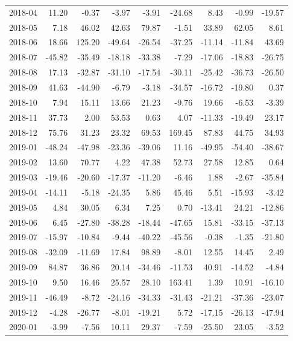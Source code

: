 \begin{table}[ht]
\begin{tabular}{lrrrrrrrr}
  2018-04 & 11.20 & -0.37 & -3.97 & -3.91 & -24.68 & 8.43 & -0.99 & -19.57 \\ 
  2018-05 & 7.18 & 46.02 & 42.63 & 79.87 & -1.51 & 33.89 & 62.05 & 8.61 \\ 
  2018-06 & 18.66 & 125.20 & -49.64 & -26.54 & -37.25 & -11.14 & -11.84 & 43.69 \\ 
  2018-07 & -45.82 & -35.49 & -18.18 & -33.38 & -7.29 & -17.06 & -18.83 & -26.75 \\ 
  2018-08 & 17.13 & -32.87 & -31.10 & -17.54 & -30.11 & -25.42 & -36.73 & -26.50 \\ 
  2018-09 & 41.63 & -44.90 & -6.79 & -3.18 & -34.57 & -16.72 & -19.80 & 0.37 \\ 
  2018-10 & 7.94 & 15.11 & 13.66 & 21.23 & -9.76 & 19.66 & -6.53 & -3.39 \\ 
  2018-11 & 37.73 & 2.00 & 53.53 & 0.63 & 4.07 & -11.33 & -19.49 & 23.17 \\ 
  2018-12 & 75.76 & 31.23 & 23.32 & 69.53 & 169.45 & 87.83 & 44.75 & 34.93 \\ 
  2019-01 & -48.24 & -47.98 & -23.36 & -39.06 & 11.16 & -49.95 & -54.40 & -38.67 \\ 
  2019-02 & 13.60 & 70.77 & 4.22 & 47.38 & 52.73 & 27.58 & 12.85 & 0.64 \\ 
  2019-03 & -19.46 & -20.60 & -17.37 & -11.20 & -6.46 & 1.88 & -2.67 & -35.84 \\ 
  2019-04 & -14.11 & -5.18 & -24.35 & 5.86 & 45.46 & 5.51 & -15.93 & -3.42 \\ 
  2019-05 & 4.84 & 30.05 & 6.34 & 7.25 & 0.70 & -13.41 & 24.21 & -12.86 \\ 
  2019-06 & 6.45 & -27.80 & -38.28 & -18.44 & -47.65 & 15.81 & -33.15 & -37.13 \\ 
  2019-07 & -15.97 & -10.84 & -9.44 & -40.22 & -45.56 & -0.38 & -1.35 & -21.80 \\ 
  2019-08 & -32.09 & -11.69 & 17.84 & 98.89 & -8.01 & 12.55 & 14.45 & 2.49 \\ 
  2019-09 & 84.87 & 36.86 & 20.14 & -34.46 & -11.53 & 40.91 & -14.52 & -4.84 \\ 
  2019-10 & 9.50 & 16.46 & 25.57 & 28.10 & 163.41 & 1.39 & 10.91 & -16.10 \\ 
  2019-11 & -46.49 & -8.72 & -24.16 & -34.33 & -31.43 & -21.21 & -37.36 & -23.07 \\ 
  2019-12 & -4.28 & -26.77 & -8.01 & -19.21 & 5.72 & -17.15 & -26.13 & -47.94 \\ 
  2020-01 & -3.99 & -7.56 & 10.11 & 29.37 & -7.59 & -25.50 & 23.05 & -3.52 \\ 

\end{tabular}
\end{table}

